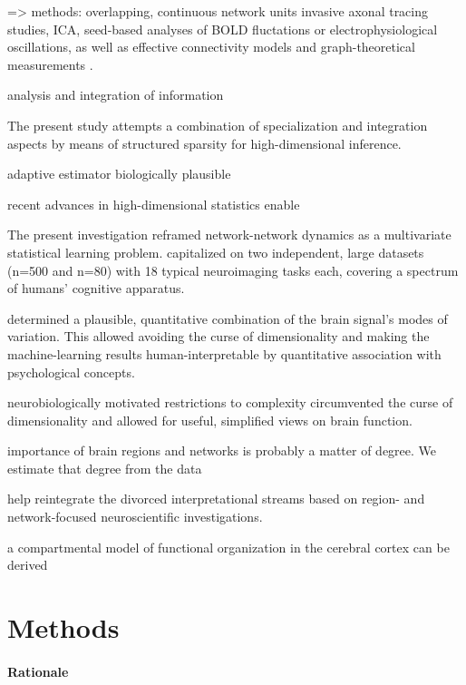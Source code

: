 \documentclass{article} %
\begin{document}
{=> methods: overlapping, continuous network units
invasive axonal tracing studies,
ICA,
seed-based analyses of BOLD fluctations or
electrophysiological oscillations,
as well as
effective connectivity models
and
graph-theoretical measurements
\citep{friston03dcm, buzsaki2004neuronal,
beckmann2005, bullmore2009complex, jbabdi2013long}.


analysis and integration of information





The present study attempts a combination of specialization and
integration aspects by means of structured sparsity
for high-dimensional inference.
%

adaptive estimator
biologically plausible

recent advances in high-dimensional statistics enable

The present investigation reframed network-network dynamics as a
multivariate statistical learning problem.
capitalized on two independent, large datasets (n=500 and n=80) with
18 typical neuroimaging tasks each, covering a spectrum of humans'
cognitive apparatus. 

determined a plausible, quantitative
combination of the brain signal's modes of variation. This allowed
avoiding the curse of dimensionality and making the machine-learning
results human-interpretable by quantitative association with
psychological concepts.

neurobiologically motivated restrictions to complexity circumvented
the curse of dimensionality and
allowed for useful, simplified views on brain function.

importance of brain regions and networks is probably a matter of
degree.
We estimate that degree from the data

help reintegrate the divorced
interpretational streams based on
region- and network-focused neuroscientific investigations.


a compartmental model of
functional organization in the cerebral cortex can be derived




\section{Methods}
%
\paragraph{Rationale}

}
\end{document}
